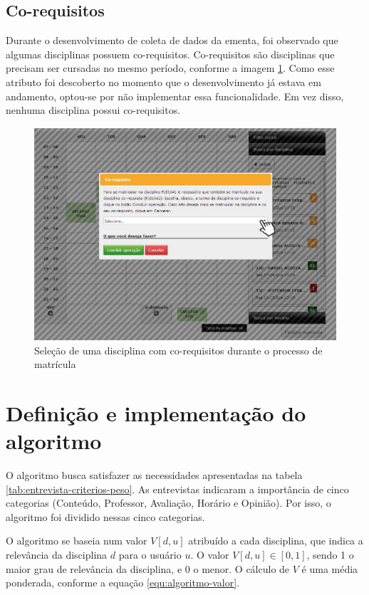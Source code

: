 \subsection{Co-requisitos}
Durante o desenvolvimento de coleta de dados da ementa, foi observado que algumas disciplinas possuem co-requisitos. Co-requisitos são disciplinas que precisam ser cursadas no mesmo período, conforme a imagem \ref{fig:corequisito}. Como esse atributo foi descoberto no momento que o desenvolvimento já estava em andamento, optou-se por não implementar essa funcionalidade. Em vez disso, nenhuma disciplina possui co-requisitos.

\begin{figure}[ht]
    \begin{center}
    \includegraphics[width=350pt]{figuras/corequisitos.png}
    \caption{Seleção de uma disciplina com co-requisitos durante o processo de matrícula}
    \label{fig:corequisito}
    \end{center}
\end{figure}



\section{Definição e implementação do algoritmo}
\label{sec:Definição e implementação do algoritmo}

O algoritmo busca satisfazer as necessidades apresentadas na tabela \ref{tab:entrevista-criterios-peso}. As entrevistas indicaram a importância de cinco categorias (Conteúdo, Professor, Avaliação, Horário e Opinião). Por isso, o algoritmo foi dividido nessas cinco categorias.

O algoritmo se baseia num valor $V[d,u]$ atribuído a cada disciplina, que indica a relevância da disciplina $d$ para o usuário $u$. O valor $V[d,u] \in [0, 1]$,
sendo 1 o maior grau de relevância da disciplina, e 0 o menor. O cálculo de $V$ é uma média ponderada, conforme a equação \ref{equ:algoritmo-valor}.

